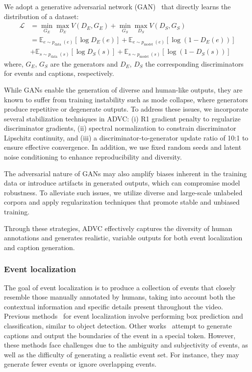 We adopt a generative adversarial network (GAN)~\cite{Goodfellow2014-hs} that directly learns the distribution of a dataset:
\begin{equation}
    \begin{aligned}
        \mathcal{L} & = \min_{G_E} \max_{D_E} V(D_E, G_E) + \min_{G_S} \max_{D_S} V(D_S, G_S)\\
        & = \mathbb{E}_{e \sim p_{\text {data }}(e)}\left[\log D_E(e)\right] + \mathbb{E}_{e \sim p_{\text {model }}(e)}\left[\log \left(1-D_E(e)\right)\right]\\
        & + \mathbb{E}_{s \sim p_{\text {data }}(s)}\left[\log D_S(s)\right] + \mathbb{E}_{s \sim p_{\text {model }}(s)}\left[\log \left(1-D_S(s)\right)\right]
    \end{aligned}
\end{equation}
where, $G_E$, $G_S$ are the generators and $D_E$, $D_S$ the corresponding discriminators for events and captions, respectively.

While GANs enable the generation of diverse and human-like outputs, they are known to suffer from training instability such as mode collapse, where generators produce repetitive or degenerate outputs. 
To address these issues, we incorporate several stabilization techniques in ADVC: (i) R1 gradient penalty to regularize discriminator gradients, (ii) spectral normalization to constrain discriminator Lipschitz continuity, and (iii) a discriminator-to-generator update ratio of 10:1 to ensure effective convergence. 
In addition, we use fixed random seeds and latent noise conditioning to enhance reproducibility and diversity.
    
The adversarial nature of GANs may also amplify biases inherent in the training data or introduce artifacts in generated outputs, which can compromise model robustness. 
To alleviate such issues, we utilize diverse and large-scale unlabeled corpora and apply regularization techniques that promote stable and unbiased training.
    
Through these strategies, ADVC effectively captures the diversity of human annotations and generates realistic, variable outputs for both event localization and caption generation.

\subsubsection{Event localization}
\label{subsubsec:method_event_localization}
The goal of event localization is to produce a collection of events that closely resemble those manually annotated by humans, taking into account both the contextual information and specific details present throughout the video.
Previous methods~\cite{Deng2021-qd,Wang2021-zi} for event localization involve performing box prediction and classification, similar to object detection.
Other works~\cite{Yang2023-fm} attempt to generate captions and output the boundaries of the event in a special token.
However, these methods face challenges due to the ambiguity and subjectivity of events, as well as the difficulty of generating a realistic event set.
For instance, they may generate fewer events or ignore overlapping events.


